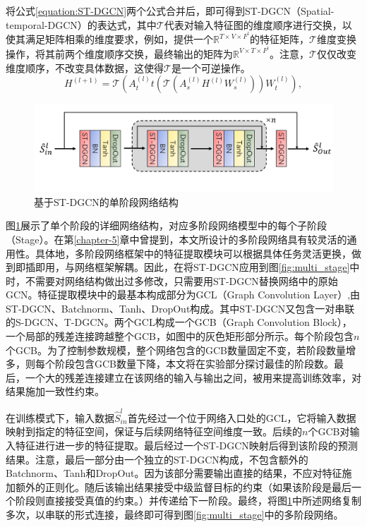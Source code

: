 将公式\ref{equation:ST-DGCN}两个公式合并后，即可得到ST-DGCN（Spatial-temporal-DGCN）的表达式，其中$\mathcal{T}$代表对输入特征图的维度顺序进行交换，以使其满足矩阵相乘的维度要求，例如，提供一个$\mathbb{R}^{T\times V\times F^{l}}$的特征矩阵，$\mathcal{T}$维度变换操作，将其前两个维度顺序交换，最终输出的矩阵为$\mathbb{R}^{V\times T\times F^{l}}$。注意，$\mathcal{T}$仅仅改变维度顺序，不改变具体数据，这使得$\mathcal{T}$是一个可逆操作。
\begin{equation}
    {H}^{(l+1)} = \mathcal{T}\left(
    {A}_{t}^{(l)}t
    \left(
    \mathcal{T}
    \left(
    {A}_{s}^{(l)}{H}^{(l)}{W}_s^{(l)}
    \right)
    \right)
    {W}_t^{(l)}
    \right),
    \label{equation:ST-DGCN_ensemble}
\end{equation}

\begin{figure}[ht]
    \centering
    \includegraphics[width=1\textwidth]{FigMa/stage_network.png}
    \vspace{-0.3cm}
    \caption{基于ST-DGCN的单阶段网络结构}
    \label{fig:stage_network_structure}
\end{figure}

图\ref{fig:stage_network_structure}展示了单个阶段的详细网络结构，对应多阶段网络模型中的每个子阶段（Stage）。在第\ref{chapter-5}章中曾提到，本文所设计的多阶段网络具有较灵活的通用性。具体地，多阶段网络框架中的特征提取模块可以根据具体任务灵活更换，做到即插即用，与网络框架解耦。因此，在将ST-DGCN应用到图\ref{fig:multi_stage}中时，不需要对网络结构做出过多修改，只需要用ST-DGCN替换网络中的原始GCN。特征提取模块中的最基本构成部分为GCL（Graph Convolution Layer）,由ST-DGCN、Batchnorm、Tanh、DropOut构成。其中ST-DGCN又包含一对串联的S-DGCN、T-DGCN。两个GCL构成一个GCB（Graph Convolution Block），一个局部的残差连接跨越整个GCB，如图中的灰色矩形部分所示。每个阶段包含$n$个GCB。为了控制参数规模，整个网络包含的GCB数量固定不变，若阶段数量增多，则每个阶段包含GCB数量下降，本文将在实验部分探讨最佳的阶段数。最后，一个大的残差连接建立在该网络的输入与输出之间，被用来提高训练效率，对结果施加一致性约束。

在训练模式下，输入数据$\hat{S}^l_{in}$首先经过一个位于网络入口处的GCL，它将输入数据映射到指定的特征空间，保证与后续网络特征空间维度一致。后续的$n$个GCB对输入特征进行进一步的特征提取。最后经过一个ST-DGCN映射后得到该阶段的预测结果。注意，最后一部分由一个独立的ST-DGCN构成，不包含额外的Batchnorm、Tanh和DropOut。因为该部分需要输出直接的结果，不应对特征施加额外的正则化。随后该输出结果接受中级监督目标的约束（如果该阶段是最后一个阶段则直接接受真值的约束。）并传递给下一阶段。最终，将图\ref{fig:stage_network_structure}中所述网络复制多次，以串联的形式连接，最终即可得到图\ref{fig:multi_stage}中的多阶段网络。

